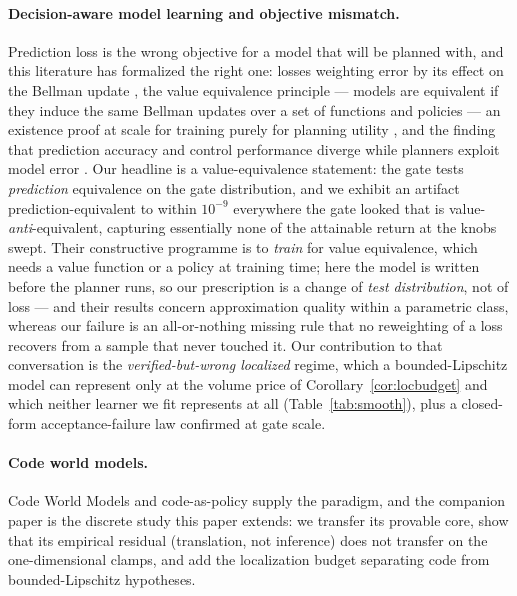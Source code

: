 \paragraph{Decision-aware model learning and objective mismatch.} Prediction loss is the wrong objective for a model that will be planned with, and this literature has formalized the right one: losses weighting error by its effect on the Bellman update \citep{farahmand2017vaml,farahmand2018itervaml}, the value equivalence principle --- models are equivalent if they induce the same Bellman updates over a set of functions and policies \citep{grimm2020vep} --- an existence proof at scale for training purely for planning utility \citep{schrittwieser2020muzero}, and the finding that prediction accuracy and control performance diverge while planners exploit model error \citep{lambert2020objective,janner2019mbpo,hafner2020dreamer}. Our headline is a value-equivalence statement: the gate tests \emph{prediction} equivalence on the gate distribution, and we exhibit an artifact prediction-equivalent to within $10^{-9}$ everywhere the gate looked that is value-\emph{anti}-equivalent, capturing essentially none of the attainable return at the knobs swept. Their constructive programme is to \emph{train} for value equivalence, which needs a value function or a policy at training time; here the model is written before the planner runs, so our prescription is a change of \emph{test distribution}, not of loss --- and their results concern approximation quality within a parametric class, whereas our failure is an all-or-nothing missing rule that no reweighting of a loss recovers from a sample that never touched it. Our contribution to that conversation is the \emph{verified-but-wrong localized} regime, which a bounded-Lipschitz model can represent only at the volume price of Corollary~\ref{cor:locbudget} and which neither learner we fit represents at all (Table~\ref{tab:smooth}), plus a closed-form acceptance-failure law confirmed at gate scale.

\paragraph{Code world models.} Code World Models \citep{lehrach2025cwm} and code-as-policy \citep{liang2023codeaspolicies,gao2023pal} supply the paradigm, and the companion paper \citep{aguilar2026verified} is the discrete study this paper extends: we transfer its provable core, show that its empirical residual (translation, not inference) does not transfer on the one-dimensional clamps, and add the localization budget separating code from bounded-Lipschitz hypotheses.
